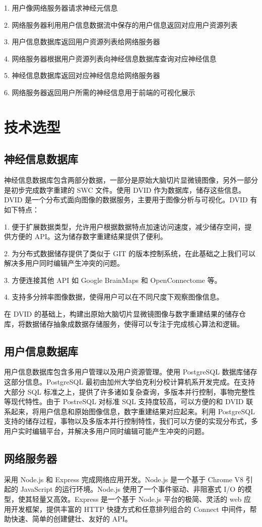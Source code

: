 1. 用户像网络服务器请求神经元信息

2. 网络服务器利用用户信息数据流中保存的用户信息返回对应用户资源列表

3. 用户信息数据库返回用户资源列表给网络服务器

4. 网络服务器根据用户资源列表向神经信息数据库查询对应神经信息

5. 神经信息数据库返回对应神经信息给网络服务器

6. 网络服务器返回用户所需的神经信息用于前端的可视化展示

\section{技术选型}

\subsection{神经信息数据库}
神经信息数据库包含两部分数据，一部分是原始大脑切片显微镜图像，另外一部分是初步完成数字重建的 SWC 文件。使用 DVID 作为数据库，储存这些信息。DVID 是一个分布式面向图像的数据服务，主要用于图像分析与可视化。DVID 有如下特点：

1. 便于扩展数据类型，允许用户根据数据特点加速访问速度，减少储存空间，提供方便的 API。这为储存数字重建结果提供了便利。

2. 为分布式数据储存提供了类似于 GIT 的版本控制系统，在此基础之上我们可以解决多用户同时编辑产生冲突的问题。

3. 方便连接其他 API 如 Google BrainMaps 和 OpenConnectome 等。

4. 支持多分辨率图像数据，使得用户可以在不同尺度下观察图像信息。

在 DVID 的基础上，构建出原始大脑切片显微镜图像与数字重建结果的储存仓库，将数据储存抽象成数据存储服务，使得可以专注于完成核心算法和逻辑。

\subsection{用户信息数据库}
用户信息数据库包含多用户管理以及用户资源管理。使用 PostgreSQL 数据库储存这部分信息。PostgreSQL 最初由加州大学伯克利分校计算机系开发完成。在支持大部分 SQL 标准之上，提供了许多诸如复杂查询，多版本并行控制，事物完整性等现代特性。由于 PostreSQL 对标准 SQL 支持度较高，可以方便的和 DVID 联系起来，将用户信息和原始图像信息，数字重建结果对应起来。利用 PostgreSQL 支持的储存过程，事物以及多版本并行控制特性，我们可以方便的实现分布式，多用户实时编辑平台，并解决多用户同时编辑可能产生冲突的问题。

\subsection{网络服务器}
采用 Node.js 和 Express 完成网络应用开发。Node.js 是一个基于 Chrome V8 引起的 JavaScript 的运行环境。Node.js 使用了一个事件驱动、非阻塞式 I/O 的模型，使其轻量又高效。Express 是一个基于 Node.js 平台的极简、灵活的 web 应用开发框架，提供丰富的 HTTP 快捷方式和任意排列组合的 Connect 中间件，帮助快速、简单的创建健壮、友好的 API。
